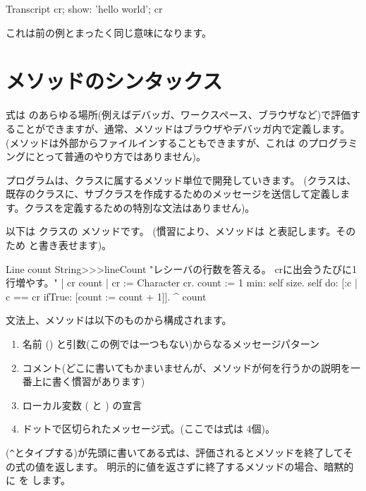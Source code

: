 \documentclass[a4paper,10pt,twoside]{book}
\begin{document}
\begin{code}{}
Transcript cr;
    show: 'hello world';
    cr
\end{code}
これは前の例とまったく同じ意味になります。

\section{メソッドのシンタックス}

式は \pharo のあらゆる場所(例えばデバッガ、ワークスペース、ブラウザなど)で評価することができますが、通常、メソッドはブラウザやデバッガ内で定義します。
(メソッドは外部からファイルインすることもできますが、これは \pharo のプログラミングにとって普通のやり方ではありません)。

プログラムは、クラスに属するメソッド単位で開発していきます。
(クラスは、既存のクラスに、サブクラスを作成するためのメッセージを送信して定義します。クラスを定義するための特別な文法はありません)。

以下は  クラスの  メソッドです。
(慣習により、メソッドは  と表記します。そのため  と書き表せます)。

\begin{method}[lineCount]{Line count}
String>>>lineCount
   "レシーバの行数を答える。
   crに出会うたびに1行増やす。"
   | cr count |
   cr := Character cr.
   count := 1 min: self size.
   self do:
      [:c | c == cr ifTrue: [count := count + 1]].
   ^ count
\end{method}

文法上、メソッドは以下のものから構成されます。
\begin{enumerate}
  \item 名前 (\ie {}) と引数(この例では一つもない)からなるメッセージパターン
  \item コメント(どこに書いてもかまいませんが、メソッドが何を行うかの説明を一番上に書く慣習があります)
  \item ローカル変数 (\ie {} と ) の宣言
  \item ドットで区切られたメッセージ式。(ここでは式は 4個)。
\end{enumerate}

\ct{^}(\verb|^|とタイプする)が先頭に書いてある式は、評価されるとメソッドを終了してその式の値を返します。
明示的に値を返さずに終了するメソッドの場合、暗黙的に  を します。
\end{document}
